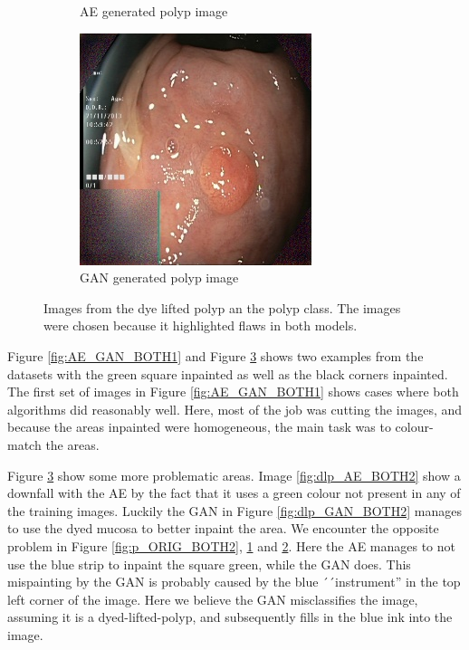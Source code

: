 \begin{figure}
\begin{subfigure}[t]{\myfigsizethree}
            \caption{AE generated polyp image}    
            \label{fig:p_AE_BOTH2}
        \end{subfigure}
        \qquad%
        \begin{subfigure}[t]{\myfigsizethree}   
            \centering 
            \includegraphics[width=\textwidth]{experiments/figures/both/greenGAN.jpg}
            \caption{GAN generated polyp image}    
            \label{fig:p_GAN_BOTH2}
        \end{subfigure}
        \caption{Images from the dye lifted polyp an the polyp class. The images were chosen because it highlighted flaws in both models. } 
        \label{fig:AE_GAN_BOTH2}
    \end{figure}

Figure \ref{fig:AE_GAN_BOTH1} and Figure \ref{fig:AE_GAN_BOTH2} shows two examples from the datasets with the green square inpainted as well as the black corners inpainted.
The first set of images in Figure \ref{fig:AE_GAN_BOTH1} shows cases where both algorithms did reasonably well. Here, most of the job was cutting the images, and because the areas inpainted were homogeneous, the main task was to colour-match the areas.

Figure \ref{fig:AE_GAN_BOTH2} show some more problematic areas. Image \ref{fig:dlp_AE_BOTH2} show a downfall with the AE by the fact that it uses a green colour not present in any of the training images. Luckily the GAN in Figure \ref{fig:dlp_GAN_BOTH2} manages to use the dyed mucosa to better inpaint the area.
We encounter the opposite problem in Figure \ref{fig:p_ORIG_BOTH2}, \ref{fig:p_AE_BOTH2} and \ref{fig:p_GAN_BOTH2}. Here the AE manages to not use the blue strip to inpaint the square green, while the GAN does. 
This mispainting by the GAN is probably caused by the blue ´´instrument'' in the top left corner of the image. Here we believe the GAN misclassifies the image, assuming it is a dyed-lifted-polyp, and subsequently fills in the blue ink into the image.


